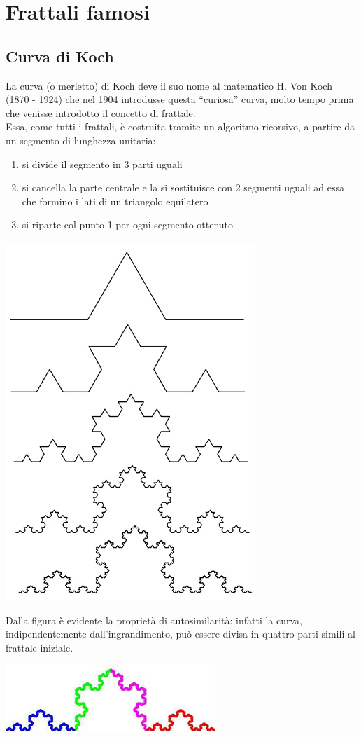 \documentclass[10pt]{report}
\begin{document}
	\chapter{Frattali famosi}
		\section{Curva di Koch}
			La curva (o merletto) di Koch deve il suo nome al matematico H. Von Koch (1870 - 1924) che nel 1904 introdusse questa ``curiosa'' curva, molto tempo prima che venisse introdotto il concetto di frattale.\\
			Essa, come tutti i frattali, è costruita tramite un algoritmo ricorsivo, a partire da un segmento di lunghezza unitaria:
			\begin{enumerate}
				\item si divide il segmento in 3 parti uguali
				\item si cancella la parte centrale e la si sostituisce con 2 segmenti uguali ad essa che formino i lati di un triangolo equilatero
				\item si riparte col punto 1 per ogni segmento ottenuto
			\end{enumerate}
			
			\begin{center}
				\includegraphics[width=0.2\linewidth, height=0.2\textheight]{"Curva di Koch/koch"}
			\end{center}
			
			\bigskip
			\bigskip
			Dalla figura è evidente la proprietà di autosimilarità: infatti la curva, indipendentemente dall'ingrandimento, può essere divisa in quattro parti simili al frattale iniziale.
			\begin{center}
				\includegraphics[width=0.4\linewidth, height=0.1\textheight]{"Curva di Koch/kochcolori"}
			\end{center}
			
\end{document}
